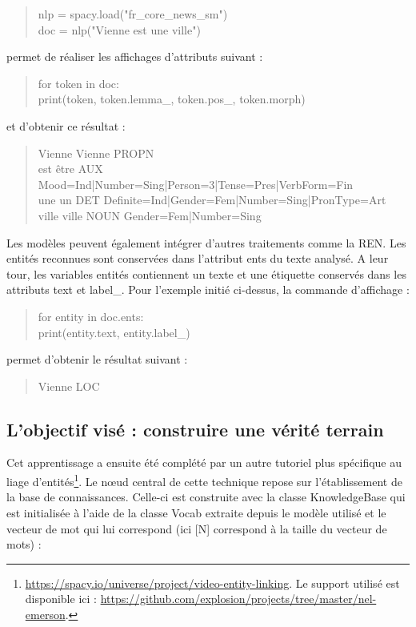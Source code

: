 \documentclass[a4paper,12pt,twoside]{book}
\begin{document}
	\begin{quotation}
		nlp = spacy.load("fr\_core\_news\_sm")\\
		\indent doc = nlp("Vienne est une ville")
	\end{quotation}

	\noindent permet de réaliser les affichages d'attributs suivant :
	
	\begin{quotation}
		for token in doc:\\
		\indent \indent print(token, token.lemma\_, token.pos\_, token.morph)
	\end{quotation}

	\noindent et d'obtenir ce résultat :
	
	\begin{quotation}
		Vienne Vienne PROPN \\
		\indent est être AUX Mood=Ind|Number=Sing|Person=3|Tense=Pres|VerbForm=Fin\\
		\indent une un DET Definite=Ind|Gender=Fem|Number=Sing|PronType=Art\\
		\indent ville ville NOUN Gender=Fem|Number=Sing\\
	\end{quotation}
	
	\noindent Les modèles peuvent également intégrer d'autres traitements comme la REN. Les entités reconnues sont conservées dans l'attribut \og ents\fg{} du texte analysé. A leur tour, les variables entités contiennent un texte et une étiquette conservés dans les attributs \og text\fg{} et \og label\_\fg{}. Pour l'exemple initié ci-dessus, la commande d'affichage :
	
	\begin{quotation}
		for entity in doc.ents:\\
		\indent \indent print(entity.text, entity.label\_)
	\end{quotation}

	\noindent permet d'obtenir le résultat suivant :
	
	\begin{quotation}
		Vienne LOC
	\end{quotation}
	
	\subsection{L'objectif visé : construire une vérité terrain}
	
	Cet apprentissage a ensuite été complété par un autre tutoriel plus spécifique au liage d'entités\footnote{\url{https://spacy.io/universe/project/video-entity-linking}. Le support utilisé est disponible ici : \url{https://github.com/explosion/projects/tree/master/nel-emerson}.}. Le nœud central de cette technique repose sur l'établissement de la base de connaissances. Celle-ci est construite avec la classe \og KnowledgeBase\fg{} qui est initialisée à l'aide de la classe \og Vocab\fg{} extraite depuis le modèle utilisé et le vecteur de mot qui lui correspond (ici [N] correspond à la taille du vecteur de mots) :
	
\end{document}
